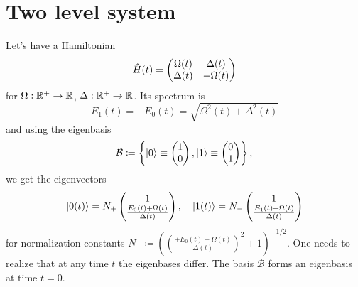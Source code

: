 \chapter{Two level system}


Let's have a Hamiltonian
\begin{equation}
    \hat{H}(t)=\begin{pmatrix}
        \Omega(t)&\Delta(t)\\
        \Delta(t)&-\Omega(t)
    \end{pmatrix}
\end{equation}
for $\Omega: \mathbb{R}^+\rightarrow \mathbb{R}$, $\Delta: \mathbb{R}^+\rightarrow \mathbb{R}$. Its spectrum is
\begin{equation}
    E_1(t)=-E_0(t)= \sqrt{\Omega^2(t)+\Delta^2(t)}
    \label{eq:energy}
\end{equation}
and using the eigenbasis
\begin{equation}
    \mathcal{B}\coloneqq \left\{
        \ket{0}\equiv\begin{pmatrix}
                1\\0
            \end{pmatrix},
        \ket{1}\equiv\begin{pmatrix}
            0\\1
        \end{pmatrix} \right\},
    \label{eq:eigenbasisDef}
\end{equation}
we get the eigenvectors 
\begin{equation}
\ket{0(t)}=N_+ \begin{pmatrix}
    1\\ \frac{E_0(t)+\Omega(t)}{\Delta(t)}
\end{pmatrix},\quad \ket{1(t)}=N_-\begin{pmatrix}
    1\\ \frac{E_1(t)+\Omega(t)}{\Delta(t)}
   \end{pmatrix}
   \label{eq:eigenvectors}
\end{equation}
for normalization constants $N_\pm\coloneqq\left(\left(\frac{\pm E_0(t)+\Omega(t)}{\Delta(t)}\right)^2+1\right)^{-1/2}$. One needs to realize that at any time $t$ the eigenbases differ. The basis $\mathcal B$ forms an eigenbasis at time $t=0$.

